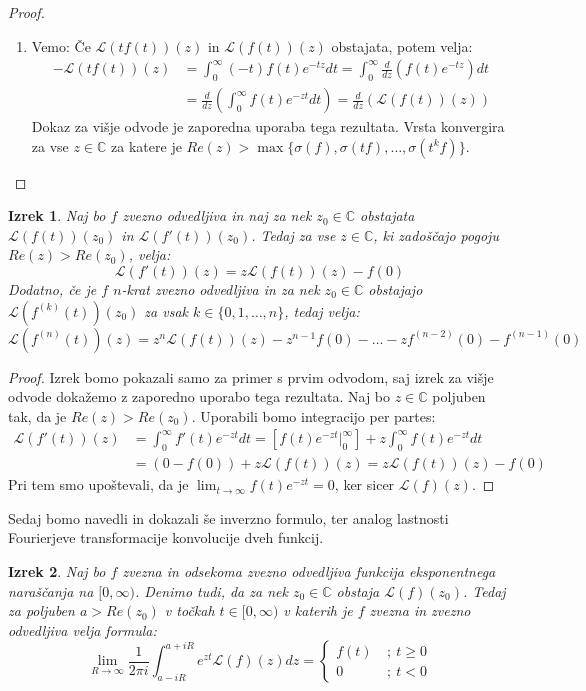 \documentclass[a4paper, 10pt]{article}
\newtheorem{izr}{Izrek}
\newcommand{\mth}[1]{\ensuremath{\mathbb{#1}}}
\newcommand{\C}{\mth{C}}
\begin{document}
\begin{proof}
\begin{enumerate}
					\item Vemo: Če $\mathcal{L}(tf(t))(z)$ in $\mathcal{L}(f(t))(z)$ obstajata, potem velja:\begin{align*}
						-\mathcal{L}(tf(t))(z) &=\int_0^\infty (-t)f(t)e^{-tz}dt = \int_0^\infty\frac{d}{dz}(f(t)e^{-tz})dt \\
						&=\frac{d}{dz}(\int_{0}^{\infty}f(t)e^{-zt}dt)=\frac{d}{dz}(\mathcal{L}(f(t))(z))
					\end{align*}
					Dokaz za višje odvode je zaporedna uporaba tega rezultata.
					Vrsta konvergira za vse $z\in\C$ za katere je $Re(z) > \max\{\sigma(f), \sigma(tf), \ldots, \sigma(t^{k}f)\}$.
				\end{enumerate}
			\end{proof}
			
			\begin{izr}
				\label{izr:LTodv}
				Naj bo $f$ zvezno odvedljiva in naj za nek $z_0\in\C$ obstajata $\mathcal{L}(f(t))(z_0)$ in $\mathcal{L}(f'(t))(z_0)$. Tedaj za vse $z\in\C$, ki zadoščajo pogoju $Re(z) > Re(z_0)$, velja: $$\mathcal{L}(f'(t))(z) = z\mathcal{L}(f(t))(z) - f(0)$$
				Dodatno, če je $f$ $n$-krat zvezno odvedljiva in za nek $z_0\in\C$ obstajajo $\mathcal{L}(f^{(k)}(t))(z_0)$ za vsak $k\in\{0, 1, \ldots, n\}$, tedaj velja: $$\mathcal{L}(f^{(n)}(t))(z) = z^n\mathcal{L}(f(t))(z) - z^{n-1}f(0) - \ldots -zf^{(n-2)}(0) -  f^{(n-1)}(0)$$
			\end{izr}
			
			\begin{proof}
				Izrek bomo pokazali samo za primer s prvim odvodom, saj izrek za višje odvode dokažemo z zaporedno uporabo tega rezultata. Naj bo $z\in\C$ poljuben tak, da je $Re(z) > Re(z_0)$. Uporabili bomo integracijo per partes: \begin{align*}
					\mathcal{L}(f'(t))(z) &= \int_{0}^{\infty}f'(t)e^{-zt}dt = [f(t)e^{-zt} \big|_{0}^{\infty}] + z\int_{0}^{\infty}f(t)e^{-zt}dt \\
					&= (0 - f(0)) + z\mathcal{L}(f(t))(z) = z\mathcal{L}(f(t))(z) - f(0)
				\end{align*}
				Pri tem smo upoštevali, da je $\lim_{t\to\infty}f(t)e^{-zt} = 0$, ker sicer $\mathcal{L}(f)(z)$.
			\end{proof}
			
			Sedaj bomo navedli in dokazali še inverzno formulo, ter analog lastnosti Fourierjeve transformacije konvolucije dveh funkcij.
			
			\begin{izr}
				\label{izr:InvLT}
				Naj bo $f$ zvezna in odsekoma zvezno odvedljiva funkcija eksponentnega naraščanja na $[0, \infty)$. Denimo tudi, da za nek $z_0\in\C$ obstaja $\mathcal{L}(f)(z_0)$. Tedaj za poljuben $a>Re(z_0)$ v točkah $t \in [0, \infty)$ v katerih je $f$ zvezna in zvezno odvedljiva velja formula: $$\lim_{R\to\infty}\frac{1}{2\pi i}\int_{a-iR}^{a+iR}e^{zt}\mathcal{L}(f)(z)dz = \begin{cases}
				f(t)~&;~ t\geq 0 \\
				0~&;~ t < 0
				\end{cases}$$
			\end{izr}
			
\end{document}

